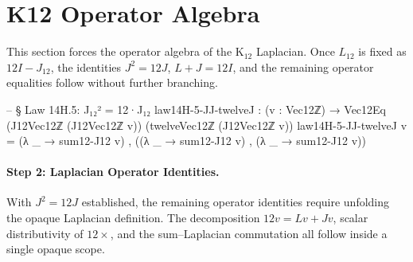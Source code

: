 \documentclass[11pt,a4paper]{book}
\def\texorpdfstring#1#2{#2}%
\begin{document}
\section{K\texorpdfstring{$_{12}$}{12} Operator Algebra}

This section forces the operator algebra of the K$_{12}$ Laplacian.
Once $L_{12}$ is fixed as $12I - J_{12}$, the identities $J^2 = 12J$,
$L + J = 12I$, and the remaining operator equalities follow without further
branching.

\begin{code}
-- § Law 14H.5: J₁₂² = 12·J₁₂
law14H-5-JJ-twelveJ : (v : Vec12ℤ) → Vec12Eq (J12Vec12ℤ (J12Vec12ℤ v)) (twelveVec12ℤ (J12Vec12ℤ v))
law14H-5-JJ-twelveJ v =
  (λ _ → sum12-J12 v) ,
  ((λ _ → sum12-J12 v) ,
   (λ _ → sum12-J12 v))
\end{code}

\paragraph{Step 2: Laplacian Operator Identities.}
With $J^2 = 12J$ established, the remaining operator identities require
unfolding the opaque Laplacian definition. The decomposition
$12v = Lv + Jv$, scalar distributivity of $12{\times}$, and the
sum--Laplacian commutation all follow inside a single opaque scope.
\end{document}
